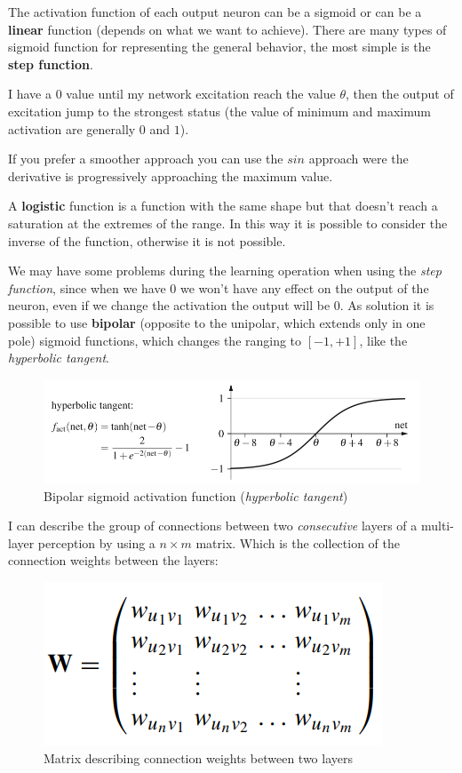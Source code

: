 \documentclass{article}
\begin{document}
The activation function of each output neuron can be a sigmoid or can be a \textbf{linear}
function (depends on what we want to achieve). There are many types of sigmoid function for representing
the general behavior, the most simple is the \textbf{step function}.

I have a $0$ value until my network excitation reach the value $\theta$, then the output
of excitation jump to the strongest status (the value of minimum and maximum activation are
generally $0$ and $1$).

If you prefer a smoother approach you can use the $sin$ approach were the derivative
is progressively approaching the maximum value.

A \textbf{logistic} function is a function with the same shape but that doesn't reach a saturation
at the extremes of the range. In this way it is possible to consider the inverse
of the function, otherwise it is not possible.

We may have some problems during the learning operation when using the \textit{step function},
since when we have $0$ we won't have any effect on the output of the neuron,
even if we change the activation the output will be $0$. As solution it is possible to
use \textbf{bipolar} (opposite to the unipolar, which extends only in one pole)
sigmoid functions, which changes the ranging to $[-1,+1]$, like the \textit{hyperbolic tangent}.

\begin{figure}[H]
    \centering
    \includegraphics[scale=0.5]{images/hyperbolic_function.png}
    \caption{Bipolar sigmoid activation function (\textit{hyperbolic tangent})}
\end{figure}

I can describe the group of connections between two \textit{consecutive} layers of
a multi-layer perception by using a $n\times m$ matrix. Which is the collection of the
connection weights between the layers:

\begin{figure}[H]
    \centering
    \includegraphics[scale=0.5]{images/weight_matrix.png}
    \caption{Matrix describing connection weights between two layers}
\end{figure}
\end{document}
